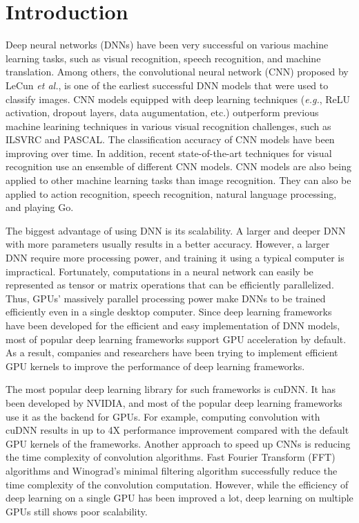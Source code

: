 \section{Introduction}

Deep neural networks (DNNs) have been very successful on various machine learning tasks, such as visual recognition\cite{krizhevsky2012imagenet,vgg,RCNN}, speech recognition\cite{speech}, and machine translation\cite{machinetranslation}. 
Among others, the convolutional neural network (CNN) proposed by LeCun \textit{et al.}\cite{726791}, is one of the earliest successful DNN models that were used to classify images. 
CNN models equipped with deep learning techniques (\textit{e.g.}, ReLU activation, dropout layers, data augumentation, etc.) outperform previous machine learining techniques in various visual recognition challenges, such as ILSVRC\cite{DBLP:journals/corr/RussakovskyDSKSMHKKBBF14} and PASCAL\cite{pascal}. 
The classification accuracy of CNN models have been improving over time. 
In addition, recent state-of-the-art techniques for visual recognition use an ensemble of different CNN models\cite{ILSVRC15}. 
CNN models are also being applied to other machine learning tasks than image recognition. 
They can also be applied to action recognition\cite{actionrecognition}, speech recognition\cite{speech}, natural language processing\cite{DBLP:journals/corr/KalchbrennerGB14}, and playing Go\cite{alphago}.

The biggest advantage of using DNN is its scalability. 
A larger and deeper DNN with more parameters usually results in a better accuracy. 
However, a larger DNN require more processing power, and training it using a typical computer is impractical. 
Fortunately, computations in a neural network can easily be represented as tensor or matrix operations that can be efficiently parallelized. 
Thus, GPUs' massively parallel processing power make DNNs to be trained efficiently even in a single desktop computer. 
Since deep learning frameworks have been developed for the efficient and easy implementation of DNN models, most of popular deep learning frameworks support GPU acceleration by default\cite{DBLP:journals/corr/Al-RfouAAa16,jia2014caffe,tensorflow2015-whitepaper,torch, cntk}. 
As a result, companies and researchers have been trying to implement efficient GPU kernels to improve the performance of deep learning frameworks.

The most popular deep learning library for such frameworks is cuDNN\cite{cudnn}. 
It has been developed by NVIDIA, and most of the popular deep learning frameworks use it as the backend for GPUs. 
For example, computing convolution with cuDNN results in up to 4X performance improvement compared with the default GPU kernels of the frameworks\cite{convnet-benchmarks}. 
Another approach to speed up CNNs is reducing the time complexity of convolution algorithms. 
Fast Fourier Transform (FFT) algorithms\cite{fftconv, fbfft} and Winograd's minimal filtering algorithm\cite{winograd} successfully reduce the time complexity of the convolution computation. 
However, while the efficiency of deep learning on a single GPU has been improved a lot, deep learning on multiple GPUs still shows poor scalability\cite{DBLP:journals/corr/YadanATR13}.

